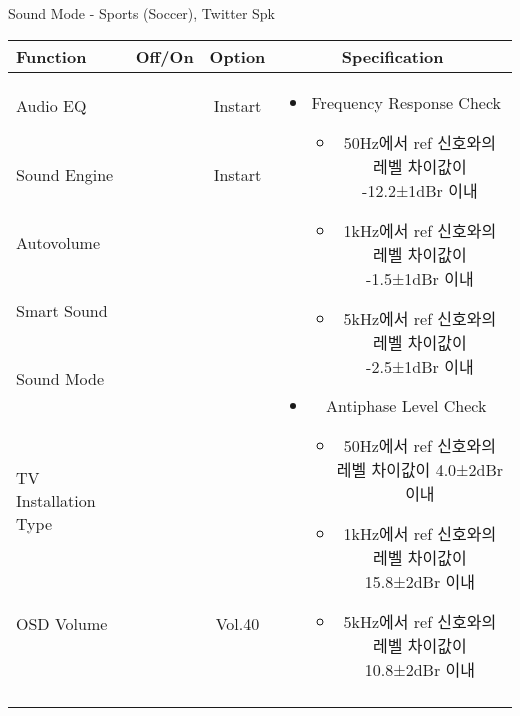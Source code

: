 \begin{frame}[t]{Sound Mode - Sports (Soccer), Twitter Spk}
\begin{tiny}
\begin{tabular}{@{}lccc@{}}
\toprule
Function & Off/On & Option & Specification \\
\midrule
Audio EQ & \color{black}{Off} & Instart &
\multirow{10}{60mm}{
\begin{itemize}
\item Frequency Response Check
	\begin{itemize}
	\item 50Hz에서 ref 신호와의 레벨 차이값이 -12.2±1dBr 이내
	\item 1kHz에서 ref 신호와의 레벨 차이값이 -1.5±1dBr 이내
	\item 5kHz에서 ref 신호와의 레벨 차이값이 -2.5±1dBr 이내
	\end{itemize}
\item Antiphase Level Check
	\begin{itemize}
	\item 50Hz에서 ref 신호와의 레벨 차이값이 4.0±2dBr 이내
	\item 1kHz에서 ref 신호와의 레벨 차이값이 15.8±2dBr 이내
	\item 5kHz에서 ref 신호와의 레벨 차이값이 10.8±2dBr 이내
	\end{itemize}
\end{itemize}
} \\
Sound Engine & \color{blue}{On} & Instart & \\
Autovolume & \color{black}{Off} & & \\
Smart Sound & \color{black}{Off} & & \\
Sound Mode & \color{blue}{On} & \color{blue}{Sports} & \\
TV Installation Type & \color{blue}{On} & \color{black}{Standtype1} & \\
OSD Volume & \color{blue}{On} & Vol.40 & \\
& & & \\
& & & \\
& & & \\
& & & \\
\midrule
\end{tabular}
\end{tiny}


\end{frame}